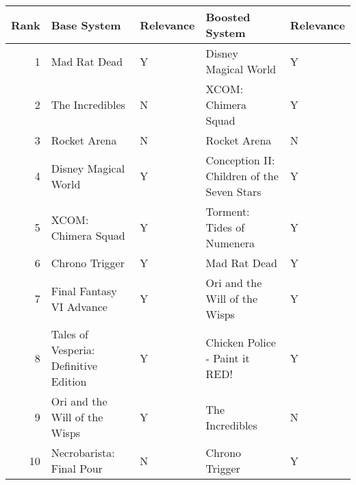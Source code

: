 \begin{tabular}{rllll}
\toprule
 Rank &                           Base System & Relevance &                             Boosted System & Relevance \\
\midrule
    1 &                          Mad Rat Dead &         Y &                       Disney Magical World &         Y \\
    2 &                       The Incredibles &         N &                        XCOM: Chimera Squad &         Y \\
    3 &                          Rocket Arena &         N &                               Rocket Arena &         N \\
    4 &                  Disney Magical World &         Y & Conception II: Children of the Seven Stars &         Y \\
    5 &                   XCOM: Chimera Squad &         Y &                 Torment: Tides of Numenera &         Y \\
    6 &                        Chrono Trigger &         Y &                               Mad Rat Dead &         Y \\
    7 &              Final Fantasy VI Advance &         Y &              Ori and the Will of the Wisps &         Y \\
    8 & Tales of Vesperia: Definitive Edition &         Y &             Chicken Police - Paint it RED! &         Y \\
    9 &         Ori and the Will of the Wisps &         Y &                            The Incredibles &         N \\
   10 &              Necrobarista: Final Pour &         N &                             Chrono Trigger &         Y \\
\bottomrule
\end{tabular}
